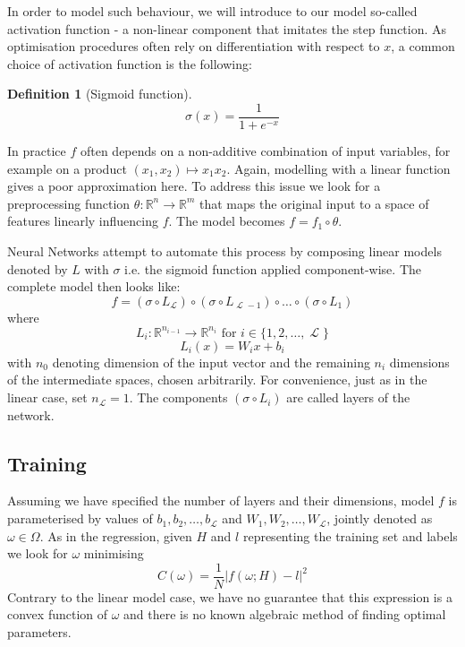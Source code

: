 \documentclass[a4paper,11pt]{article}
\theoremstyle{break}
\newtheorem{definition}{Definition}[section]
\newcommand{\R}{\mathbb{R}}
\DeclareMathOperator{\La}{\mathcal{L}}
\begin{document}
In order to model such behaviour, we will introduce to our model so-called activation function - a non-linear component  that imitates the step function. As optimisation procedures often rely on differentiation with respect to $x$, a common choice of activation function is the following:

\begin{definition}[Sigmoid function]
    $$ \sigma(x) = \frac{1}{1 + e^{-x}}$$
\end{definition}

In practice $f$ often depends on a non-additive combination of input variables, for example on a product $(x_1, x_2) \mapsto x_1 x_2$.
Again, modelling with a linear function gives a poor approximation here.
To address this issue we look for a preprocessing function $ \theta : \R^n \to \R^m$ that maps the original input to a space of features linearly influencing $f$. The model becomes $ f = f_1 \circ \theta $.

Neural Networks attempt to automate this process by composing linear models denoted by $L$ with $\sigma$ i.e. the sigmoid function applied component-wise.
The complete model then looks like:
$$ f = (\sigma \circ L_{\La}) \circ (\sigma \circ L_{\La - 1}) \circ \ldots \circ (\sigma \circ L_{1}) $$
where
$$ L_i : \R^{n_{i-1}} \to \R^{n_{i}} \text{ for } i \in \{1, 2, \ldots, \La \} $$
$$ L_i(x) = W_i x + b_i $$
with $ n_0 $ denoting dimension of the input vector and the remaining $ n_i $ dimensions of the intermediate spaces, chosen arbitrarily. For convenience, just as in the linear case, set $ n_{\La} = 1 $. The components $ (\sigma \circ L_{i}) $ are called layers of the network.

\subsection{Training}

Assuming we have specified the number of layers and their dimensions, model $f$ is parameterised by values of $ b_1, b_2, \ldots, b_{\La} $ and $ W_1, W_2, \ldots, W_{\La} $, jointly denoted as $ \omega \in \Omega $.
As in the regression, given $H$ and $l$ representing the training set and labels we look for $ \omega $ minimising
    $$ C(\omega) =  \frac{1}{N} | f(\omega; H) - l |^2  $$
Contrary to the linear model case, we have no guarantee that this expression is a convex function of $ \omega $ and there is no known algebraic method of finding optimal parameters.
\end{document}
